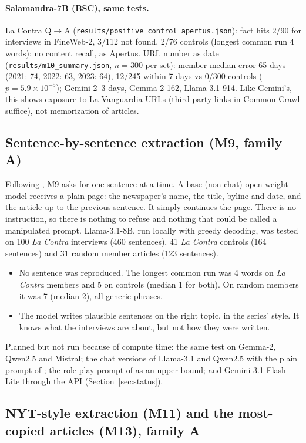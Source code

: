 \documentclass[10pt,a4paper]{article}
\begin{document}
\paragraph{Salamandra-7B (BSC), same tests.} La Contra Q$\to$A (\texttt{results/positive\_control\_apertus.json}): fact hits 2/90 for interviews in FineWeb-2, 3/112 not found, 2/76 controls (longest common run 4 words): no content recall, as Apertus. URL number as date (\texttt{results/m10\_summary.json}, $n=300$ per set): member median error 65 days (2021: 74, 2022: 63, 2023: 64), 12/245 within 7 days vs 0/300 controls ($p=5.9\times10^{-5}$); Gemini 2--3 days, Gemma-2 162, Llama-3.1 914. Like Gemini's, this shows exposure to La Vanguardia URLs (third-party links in Common Crawl suffice), not memorization of articles.

\subsection{Sentence-by-sentence extraction (M9, family A)}\label{sec:m9}
Following \cite{su2024}, M9 asks for one sentence at a time. A base (non-chat) open-weight model receives a plain
page: the newspaper's name, the title, byline and date, and the article up to the previous sentence. It simply
continues the page. There is no instruction, so there is nothing to refuse and nothing that could be called a
manipulated prompt. Llama-3.1-8B, run locally with greedy decoding, was tested on 100 \emph{La Contra} interviews
(460 sentences), 41 \emph{La Contra} controls (164 sentences) and 31 random member articles (123 sentences).
\begin{itemize}
\item No sentence was reproduced. The longest common run was 4 words on \emph{La Contra} members and 5 on controls
(median 1 for both). On random members it was 7 (median 2), all generic phrases.
\item The model writes plausible sentences on the right topic, in the series' style. It knows what the interviews
are about, but not how they were written.
\end{itemize}
Planned but not run because of compute time: the same test on Gemma-2, Qwen2.5 and Mistral; the chat versions of
Llama-3.1 and Qwen2.5 with the plain prompt of \cite{su2024}; the role-play prompt of \cite{freeman2024} as an upper
bound; and Gemini 3.1 Flash-Lite through the API (Section~\ref{sec:status}).

\subsection{NYT-style extraction (M11) and the most-copied articles (M13), family A}\label{sec:m11m13}
\end{document}
